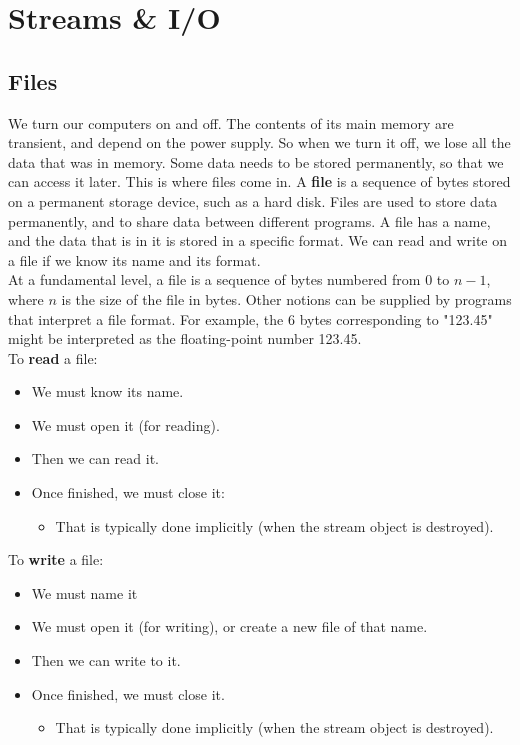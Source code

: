 \chapter{Streams \& I/O}

\section{Files}

We turn our computers on and off. The contents of its main memory are transient, and depend 
on the power supply. So when we turn it off, we lose all the data that was in memory. Some data
needs to be stored permanently, so that we can access it later. This is where files come in.
A \textbf{file} is a sequence of bytes stored on a permanent storage device, such as a hard disk.
Files are used to store data permanently, and to share data between different programs. A file 
has a name, and the data that is in it is stored in a specific format. We can read and 
write on a file if we know its name and its format. \\

At a fundamental level, a file is a sequence of bytes numbered from 0 to $n-1$, where $n$ is the
size of the file in bytes. Other notions can be supplied by programs that interpret a file format.
For example, the 6 bytes corresponding to "123.45" might be interpreted as the floating-point
number 123.45. \\

To \textbf{read} a file:
\begin{itemize}
    \item We must know its name.
    \item We must open it (for reading).
    \item Then we can read it.
    \item Once finished, we must close it:
    \begin{itemize}
        \item That is typically done implicitly (when the stream object is destroyed).
    \end{itemize}
\end{itemize}

To \textbf{write} a file:
\begin{itemize}
    \item We must name it
    \item We must open it (for writing), or create a new file of that name.
    \item Then we can write to it.
    \item Once finished, we must close it.
    \begin{itemize}
        \item That is typically done implicitly (when the stream object is destroyed).
    \end{itemize}
\end{itemize}

